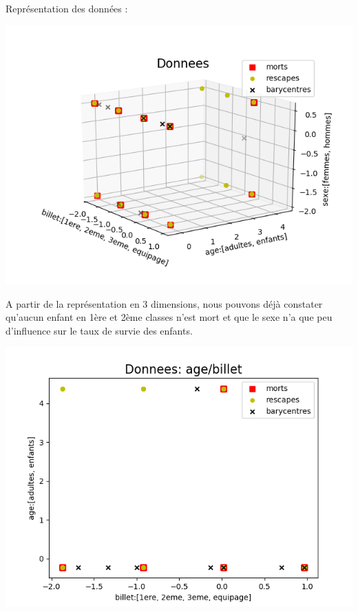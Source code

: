 \documentclass[a4paper,10pt]{article}
\begin{document}
        Représentation des données :
        
        \begin{center}
            \includegraphics{p1-2}
        \end{center}
        
        A partir de la représentation en 3 dimensions, nous pouvons déjà constater qu’aucun enfant en 1ère et 2ème classes n’est mort et que le sexe n’a que peu d’influence sur le taux de survie des enfants.
        
        \begin{center}
            \includegraphics{p1-3}
        \end{center}
        
\end{document}
